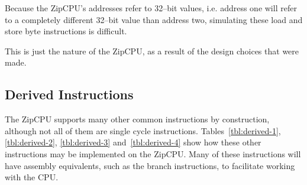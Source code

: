 \documentclass{gqtekspec}
\begin{document}
Because the ZipCPU's addresses refer to 32--bit values, i.e. address one
will refer to a completely different 32--bit value than address two, simulating
these load and store byte instructions is difficult.

This is just the nature of the ZipCPU, as a result of the design choices that
were made.

\subsection{Derived Instructions}
The ZipCPU supports many other common instructions by construction, although
not all of them are single cycle instructions.  Tables~\ref{tbl:derived-1}, \ref{tbl:derived-2}, \ref{tbl:derived-3} and~\ref{tbl:derived-4} show how these
other instructions may be implemented on the ZipCPU.  Many of these
instructions will have assembly equivalents,
such as the branch instructions, to facilitate working with the CPU.
\end{document}
